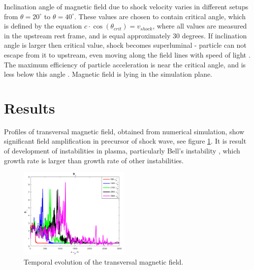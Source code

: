 \documentclass[a4paper]{jpconf}
\begin{document}
	Inclination angle of magnetic field due to shock velocity varies in different setups from $\theta = 20^\circ$ to $\theta = 40^\circ$. These values are chosen to contain critical angle, which is defined by the equation $c\cdot \cos(\theta_{crit})=v_{shock}$, where all values are measured in the upstream rest frame, and is equal approximately $30$ degrees. If inclination angle is larger then critical value, shock becomes superluminal - particle can not escape from it to upstream, even moving along the field lines with speed of light \cite{Pelletier2017,Sironi2011}. The maximum efficiency of particle acceleration is near the critical angle, and is less below this angle \cite{Romansky18}. Magnetic field is lying in the simulation plane.
	
	
	\section{Results}
	
	Profiles of transversal magnetic field, obtained from numerical simulation, show significant field amplification in precursor of shock wave, see figure \ref{field}. It is result of development of instabilities in plasma, particularly Bell's instability \cite{Bell04}, which growth rate is larger than growth rate of other instabilities.
	
	\begin{figure}[h!]
		\centering
		\includegraphics[width=0.48\textwidth]{fig/Bnorm.png} 
		\caption{Temporal evolution of the transversal magnetic field.}
		\label{field}
	\end{figure}
	
\end{document}
